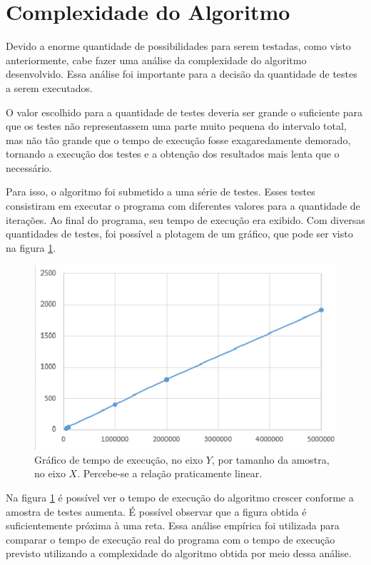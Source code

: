 \documentclass[a4paper,12pt,oneside]{report}
\begin{document}
\section {Complexidade do Algoritmo}
\label{sec:complexidade}
\hspace*{+15pt} Devido a enorme quantidade de possibilidades para serem testadas, como visto anteriormente, cabe fazer uma an\'{a}lise da complexidade do algoritmo desenvolvido. Essa an\'{a}lise foi importante para a decis\~{a}o da quantidade de testes a serem executados. 
\\
\par O valor escolhido para a quantidade de testes deveria ser grande o suficiente para que os testes n\~{a}o representassem uma parte muito pequena do intervalo total, mas n\~{a}o t\~{a}o grande que o tempo de execu\c{c}\~{a}o fosse exagaredamente de\-mo\-ra\-do, tornando a execu\c{c}\~{a}o dos testes e a obten\c{c}\~{a}o dos resultados mais lenta que o necess\'{a}rio.
\\
\par Para isso, o algoritmo foi submetido a uma s\'{e}rie de testes. Esses testes consistiram em executar o programa com diferentes valores para a quantidade de itera\c{c}\~{o}es. Ao final do programa, seu tempo de execu\c{c}\~{a}o era exibido. Com diversas quantidades de testes, foi poss\'{i}vel a plotagem de um gr\'{a}fico, que pode ser visto na figura \ref{fig:tempo_exec}. 
\begin{figure}[H]
\centering
\includegraphics[width=400pt]{tempo_execucao.eps}
\caption{Gr\'{a}fico de tempo de execu\c{c}\~{a}o, no eixo $Y$, por tamanho da amostra, no eixo $X$. Percebe-se a rela\c{c}\~{a}o praticamente linear.}
\label{fig:tempo_exec}
\end{figure}
\par Na figura \ref{fig:tempo_exec} \'{e} poss\'{i}vel ver o tempo de execu\c{c}\~{a}o do algoritmo crescer conforme a amostra de testes aumenta. \'{E} poss\'{i}vel observar que a figura obtida \'{e} suficientemente pr\'{o}xima \`{a} uma reta. Essa an\'{a}lise emp\'{i}rica foi utilizada para comparar o tempo de execu\c{c}\~{a}o real do programa com o tempo de execu\c{c}\~{a}o previsto utilizando a complexidade do algoritmo obtida por meio dessa an\'{a}lise.
\end{document}
